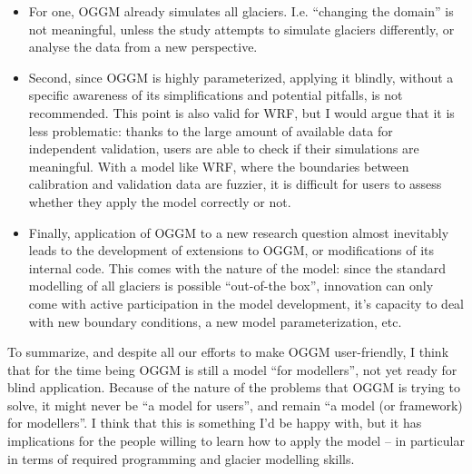 \begin{itemize}[nosep]
\item {} 
For one, OGGM already simulates
all glaciers. I.e. “changing the domain” is not meaningful, unless the study attempts to simulate glaciers
differently, or analyse the data from a new perspective.

\item {} 
Second, since OGGM is highly parameterized, applying it blindly, without a specific awareness of its simplifications
and potential pitfalls, is not recommended.
This point is also valid for WRF, but I would argue that it is less problematic: thanks to the large
amount of available data for independent validation, users are able to check if their simulations are meaningful.
With a model like WRF, where the boundaries between calibration and validation data are fuzzier, it is difficult
for users to assess whether they apply the model correctly or not.

\item {} 
Finally, application of OGGM to a new research question almost inevitably leads to the development of extensions to
OGGM, or modifications of its internal code. This comes with the nature of the model: since the standard modelling of all
glaciers is possible “out-of-the box”, innovation can only come with active participation in the model development,
it’s capacity to deal with new boundary conditions, a new model parameterization, etc.

\end{itemize}

To summarize, and despite all our efforts to make OGGM user-friendly, I think that for the time being OGGM is
still a model “for modellers”, not yet ready for blind application. Because of the nature of the problems that
OGGM is trying to solve, it might never be “a model for users”, and remain “a model (or framework) for modellers”.
I think that this is something I’d be happy with, but it has implications for the people willing to learn how to apply
the model -- in particular in terms of required programming and glacier modelling skills.